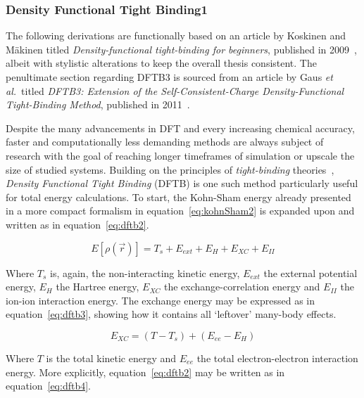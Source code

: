 \documentclass[11pt]{article}
\begin{document}
\subsubsection{Density Functional Tight Binding1}
The following derivations are functionally based on an article by Koskinen and Mäkinen titled \textit{Density-functional tight-binding for beginners}, published in 2009~\cite{Koskinen2009}, albeit with stylistic alterations to keep the overall thesis consistent.
The penultimate section regarding DFTB3 is sourced from an article by Gaus \textit{et al.}~titled \textit{DFTB3: Extension of the Self-Consistent-Charge Density-Functional Tight-Binding Method}, published in 2011~\cite{Gaus2011}.
\\ \par \noindent Despite the many advancements in DFT and every increasing chemical accuracy, faster and computationally less demanding methods are always subject of research with the goal of reaching longer timeframes of simulation or upscale the size of studied systems.
Building on the principles of \textit{tight-binding} theories~\cite{Goringe1997},  \textit{Density Functional Tight Binding} (DFTB) is one such method particularly useful for total energy calculations.
To start, the Kohn-Sham energy already presented in a more compact formalism in equation~\ref{eq:kohnSham2} is expanded upon and written as in equation~\ref{eq:dftb2}.

\begin{equation}
  E[\rho(\vec{r})] = T_s + E_{ext} + E_{H} + E_{XC} + E_{II}
  \label{eq:dftb2}
\end{equation}

\bigskip

\noindent Where $T_s$ is, again, the non-interacting kinetic energy, $E_{ext}$ the external potential energy, $E_{H}$ the Hartree energy, $E_{XC}$ the exchange-correlation energy and $E_{II}$ the ion-ion interaction energy.
The exchange energy may be expressed as in equation~\ref{eq:dftb3}, showing how it contains all `leftover' many-body effects.

\begin{equation}
  E_{XC} = (T-T_s) + (E_{ee} - E_{H})
  \label{eq:dftb3}
\end{equation}

\bigskip

\noindent Where $T$ is the total kinetic energy and $E_{ee}$ the total electron-electron interaction energy.
More explicitly, equation~\ref{eq:dftb2} may be written as in equation~\ref{eq:dftb4}.
\end{document}
